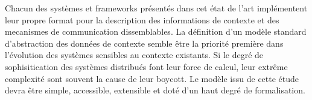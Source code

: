Chacun des systèmes et frameworks présentés dans cet état de l'art implémentent
leur propre format pour la description des informations de contexte et des
mecanismes de communication dissemblables. La définition d'un modèle standard
d'abstraction des données de contexte semble être la priorité première dans
l'évolution des systèmes sensibles au contexte existants. Si le degré de
sophisitication des systèmes distribués font leur force de calcul, leur
extrême complexité sont souvent la cause de leur boycott. Le modèle issu de
cette étude devra être simple, accessible, extensible et doté d'un haut degré de
formalisation.

